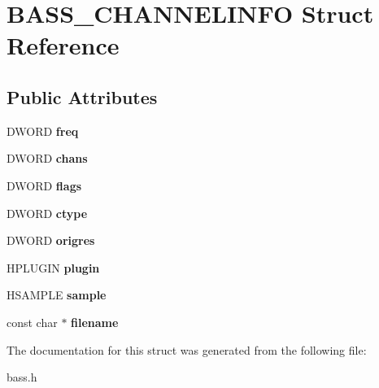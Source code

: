 \section{B\+A\+S\+S\+\_\+\+C\+H\+A\+N\+N\+E\+L\+I\+N\+F\+O Struct Reference}
\label{struct_b_a_s_s___c_h_a_n_n_e_l_i_n_f_o}
\subsection*{Public Attributes}
\begin{DoxyCompactItemize}
\item 
D\+W\+O\+R\+D {\bfseries freq}\label{struct_b_a_s_s___c_h_a_n_n_e_l_i_n_f_o_ad1b77f57519254df9076321422ae8088}

\item 
D\+W\+O\+R\+D {\bfseries chans}\label{struct_b_a_s_s___c_h_a_n_n_e_l_i_n_f_o_a6ffe1288a34a2379fe29182ccacd4851}

\item 
D\+W\+O\+R\+D {\bfseries flags}\label{struct_b_a_s_s___c_h_a_n_n_e_l_i_n_f_o_a8af64f94d3e478251a26927f2a4cc181}

\item 
D\+W\+O\+R\+D {\bfseries ctype}\label{struct_b_a_s_s___c_h_a_n_n_e_l_i_n_f_o_a8485903de8da5ea87f18af4fead8b109}

\item 
D\+W\+O\+R\+D {\bfseries origres}\label{struct_b_a_s_s___c_h_a_n_n_e_l_i_n_f_o_a65dafe34621563b319749edff82d824c}

\item 
H\+P\+L\+U\+G\+I\+N {\bfseries plugin}\label{struct_b_a_s_s___c_h_a_n_n_e_l_i_n_f_o_a13d3801ae12e966bf36bdf7cf147fd40}

\item 
H\+S\+A\+M\+P\+L\+E {\bfseries sample}\label{struct_b_a_s_s___c_h_a_n_n_e_l_i_n_f_o_ae2314c04cfb2a04031df1a34d9eb898e}

\item 
const char $\ast$ {\bfseries filename}\label{struct_b_a_s_s___c_h_a_n_n_e_l_i_n_f_o_acf60ef395b6c5432b617d092ad1c3ce1}

\end{DoxyCompactItemize}


The documentation for this struct was generated from the following file\+:\begin{DoxyCompactItemize}
\item 
bass.\+h\end{DoxyCompactItemize}

